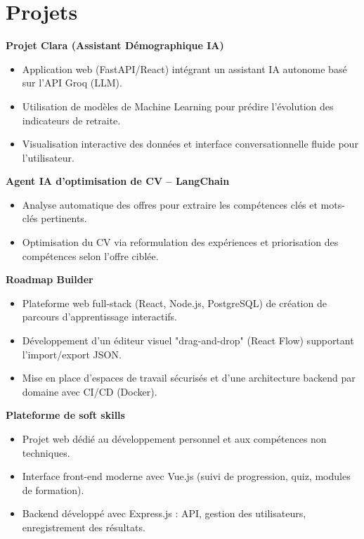 \documentclass[a4paper,11pt]{article}
\begin{document}
\section*{Projets}

\textbf{Projet Clara (Assistant Démographique IA)}
\begin{itemize}[leftmargin=*, noitemsep]
    \item Application web (FastAPI/React) intégrant un assistant IA autonome basé sur l'API Groq (LLM).
    \item Utilisation de modèles de Machine Learning pour prédire l'évolution des indicateurs de retraite.
    \item Visualisation interactive des données et interface conversationnelle fluide pour l'utilisateur.
\end{itemize}

\textbf{Agent IA d'optimisation de CV – LangChain}
\begin{itemize}[leftmargin=*, noitemsep]
    \item Analyse automatique des offres pour extraire les compétences clés et mots-clés pertinents.
    \item Optimisation du CV via reformulation des expériences et priorisation des compétences selon l'offre ciblée.
\end{itemize}

\textbf{Roadmap Builder}
\begin{itemize}[leftmargin=*, noitemsep]
    \item Plateforme web full-stack (React, Node.js, PostgreSQL) de création de parcours d'apprentissage interactifs.
    \item Développement d'un éditeur visuel "drag-and-drop" (React Flow) supportant l'import/export JSON.
    \item Mise en place d'espaces de travail sécurisés et d'une architecture backend par domaine avec CI/CD (Docker).
\end{itemize}

\textbf{Plateforme de soft skills}
\begin{itemize}[leftmargin=*, noitemsep]
    \item Projet web dédié au développement personnel et aux compétences non techniques.
    \item Interface front-end moderne avec Vue.js (suivi de progression, quiz, modules de formation).
    \item Backend développé avec Express.js : API, gestion des utilisateurs, enregistrement des résultats.
\end{itemize}
\end{document}
